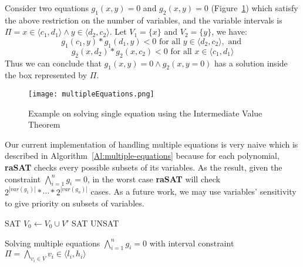 \begin{example}
Consider two equations $g_1(x, y)=0$ and $g_2(x, y) = 0$ (Figure~\ref{fig:multiple-equations}) which satisfy the above restriction on the number of variables, and the variable intervals is $\Pi = x \in \langle c_1, d_1 \rangle \wedge y \in \langle d_2, c_2 \rangle$. Let $V_1 = \{x\}$ and $V_2 = \{y\}$, we have:
\[g_1(c_1, y)*g_1(d_1, y) < 0 \text{ for all } y \in \langle d_2, c_2 \rangle, \text{ and }\]
\[g_2(x, d_2)*g_2(x, c_2) < 0 \text{ for all } x \in \langle c_1, d_1 \rangle\]
Thus we can conclude that $g_1(x,y)=0 \wedge g_2(x,y=0)$ has a solution inside the box represented by $\Pi$.
\end{example}
\begin{figure}[ht]
\centering
\texttt{[image: multipleEquations.png]} 
\caption{Example on solving single equation using the Intermediate Value Theorem} 
\label{fig:multiple-equations} 
\end{figure}
Our current implementation of handling multiple equations is very naive which is described in Algorithm~\ref{Al:multiple-equations} because for each polynomial, \textbf{raSAT} checks every possible subsets of its variables. As the result, given the constraint $\bigwedge\limits_{i=1}^ng_i=0$, in the worst case \textbf{raSAT} will check $2^{|var(g_1)|}*\cdots*2^{|var(g_n)|}$ cases. As a future work, we may use variables' sensitivity to give priority on subsets of variables.
\begin{algorithm}
\begin{algorithmic}
 
	\State \Return SAT
\EndIf
{} 
		\State $V_0 \gets V_0 \cup V'$
			\State \Return SAT
		\EndIf
	\EndIf
\EndFor
\State \Return UNSAT
\EndFunction
\State {}
\end{algorithmic}
\caption{Solving multiple equations $\bigwedge\limits_{i=1}^n g_i = 0$ with interval constraint ${\Pi = \bigwedge\limits_{v_i \in V} v_i \in \langle l_i, h_i \rangle}$}
\label{Al:multiple-equations}
\end{algorithm}


